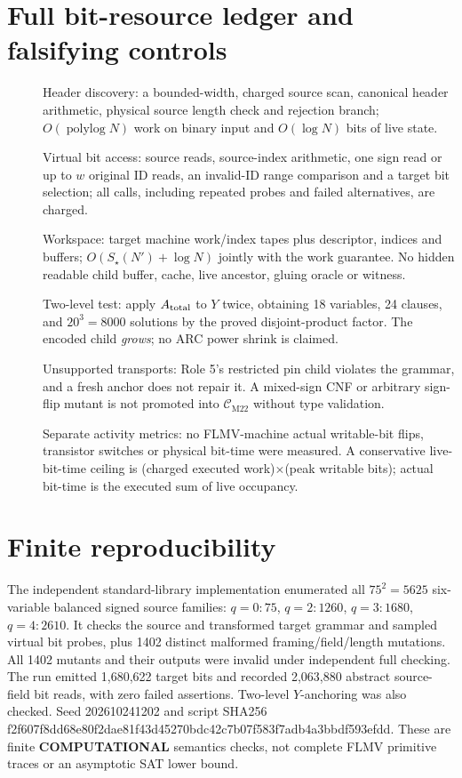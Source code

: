 \documentclass[11pt]{article}
\newcommand{\CM}{\mathcal C_{\mathrm{M22}}}
\begin{document}
\section{Full bit-resource ledger and falsifying controls}
\begin{description}
\item[] Header discovery: a bounded-width, charged source scan, canonical header arithmetic, physical source length check and rejection branch; $O(\operatorname{polylog}N)$ work on binary input and $O(\log N)$ bits of live state.
\item[] Virtual bit access: source reads, source-index arithmetic, one sign read or up to $w$ original ID reads, an invalid-ID range comparison and a target bit selection; all calls, including repeated probes and failed alternatives, are charged.
\item[] Workspace: target machine work/index tapes plus descriptor, indices and buffers; $O(S_\star(N')+\log N)$ jointly with the work guarantee. No hidden readable child buffer, cache, live ancestor, gluing oracle or witness.
\item[] Two-level test: apply $A_{\rm total}$ to $Y$ twice, obtaining 18 variables, 24 clauses, and $20^3=8000$ solutions by the proved disjoint-product factor. The encoded child \emph{grows}; no ARC power shrink is claimed.
\item[] Unsupported transports: Role 5's restricted pin child violates the grammar, and a fresh anchor does not repair it. A mixed-sign CNF or arbitrary sign-flip mutant is not promoted into $\CM$ without type validation.
\item[] Separate activity metrics: no FLMV-machine actual writable-bit flips, transistor switches or physical bit-time were measured. A conservative live-bit-time ceiling is (charged executed work)$\times$(peak writable bits); actual bit-time is the executed sum of live occupancy.
\end{description}

\section{Finite reproducibility}
The independent standard-library implementation enumerated all $75^2=5625$ six-variable balanced signed source families: $q=0:75$, $q=2:1260$, $q=3:1680$, $q=4:2610$. It checks the source and transformed target grammar and sampled virtual bit probes, plus 1402 distinct malformed framing/field/length mutations. All 1402 mutants and their outputs were invalid under independent full checking. The run emitted 1,680,622 target bits and recorded 2,063,880 abstract source-field bit reads, with zero failed assertions. Two-level $Y$-anchoring was also checked. Seed 202610241202 and script SHA256 f2f607f8dd68e80f2dae81f43d45270bdc42c7b07f583f7adb4a3bbdf593efdd. These are finite \textbf{COMPUTATIONAL} semantics checks, not complete FLMV primitive traces or an asymptotic SAT lower bound.
\end{document}
